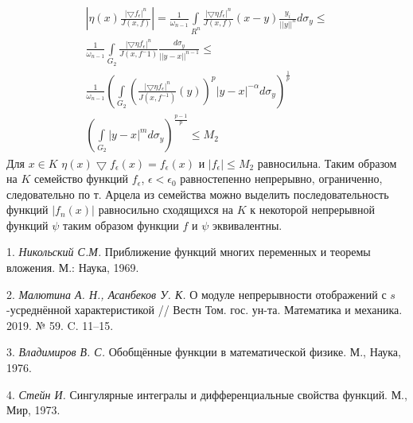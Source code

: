  \begin{multline}
 \left|\eta(x)\frac{|\bigtriangledown f_\epsilon|^n}{J(x,f)}\right|=\frac{1}{\omega_{n-1}}\int\limits_{R^n}\frac{|\bigtriangledown\eta f_\epsilon|^n}{J(x,f)}(x-y)\frac{y_i}{||y||^n}d\sigma_{y}\leq
 \\
 \frac{1}{\omega_{n-1}}\int\limits_{G_2}\frac{|\bigtriangledown\eta f_\epsilon|^n}{J(x,f^-1)}\frac{d\sigma_{y}}{||y-x||^{n-1}}\leq
 \\
 \frac{1}{\omega_{n-1}}\left(\int\limits_{G_2}\left(\frac{|\bigtriangledown\eta f_\epsilon|^n}{J(x,f^{-1})}(y)\right)^p |y-x|^{-\alpha}d\sigma_y\right)^{\frac{1}{p}}\\\left(\int\limits_{G_2}|y-x|^{m}d\sigma_y\right)^{\frac{p-1}{p}}\leq M_2
\end{multline}
Для $x\in K$ $\eta(x)\bigtriangledown f_{\epsilon}(x)=f_{\epsilon}(x)$ и $|f_\epsilon|\leq M_2$ равносильна.
Таким образом на $K$ семейство функций $f_\epsilon$, $\epsilon<\epsilon_0$ равностепенно непрерывно, ограниченно, следовательно по т. Арцела из семейства можно выделить последовательность функций $|f_{n}(x)|$ равносильно сходящихся на $K$ к некоторой непрерывной функций $\psi$ таким образом функции $f$ и $\psi$ эквивалентны.


\litlist

1. {\it Никольский С.М.} Приближение функций многих переменных и теоремы вложения. М.: Наука, 1969.

2. {\it Малютина А. Н., Асанбеков У. К.} О модуле непрерывности отображений с $s$-усреднённой характеристикой // Вестн Том. гос. ун-та. Математика и механика. 2019. № 59. C. 11–15.

3. {\it Владимиров В. С.} Обобщённые функции в математической физике. М., Наука, 1976.

4. {\it Стейн И.} Сингулярные интегралы и дифференциальные свойства функций. М., Мир, 1973.
